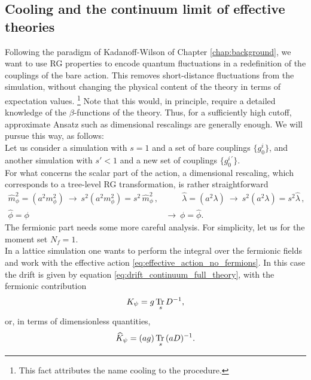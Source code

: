 \subsection{Cooling and the continuum limit of effective theories}
Following the paradigm of Kadanoff-Wilson of Chapter \ref{chap:background}, we want to use RG properties to encode quantum fluctuations in a redefinition of the couplings of the bare action. This removes short-distance fluctuations from the simulation, without changing the physical content of the theory in terms of expectation values. \footnote{This fact attributes the name cooling to the procedure.}
Note that this would, in principle, require a detailed knowledge of the $\beta$-functions of the theory. Thus, for a sufficiently high cutoff, approximate Ansatz such as dimensional rescalings are generally enough. We will pursue this way, as follows: \\
Let us consider a simulation with $s=1$ and a set of bare couplings $\{g^i_0\}$, and another simulation with $s'<1$ and a new set of couplings $\{g^{i \, \prime}_0\}$. \\
For what concerns the scalar part of the action, a dimensional rescaling, which corresponds to a tree-level RG transformation, is rather straightforward
\begin{equation*}
    \begin{aligned}
    \hat{m}_\phi^2 = (a^2m_\phi^2) \ \to \ s^2(a^2m_\phi^2) = s^2 \, \hat{m}_\phi^2 \, , &\qquad \hat{\lambda} = (a^2\lambda) \ \to  \ s^2 (a^2\lambda) = s^2\hat{\lambda} \, , \\
    \hat\phi = \phi \ &\to \ \phi = \hat\phi.
    \end{aligned}
\end{equation*}
The fermionic part needs some more careful analysis. For simplicity, let us for the moment set $N_f = 1$. \\
In a lattice simulation one wants to perform the integral over the fermionic fields and work with the effective action \eqref{eq:effective_action_no_fermions}. In this case the drift is given by equation \eqref{eq:drift_continuum_full_theory}, with the fermionic contribution
\begin{equation}
    	K_{\psi} = g \, \underset{s}{\operatorname{\text{Tr} \,}}{D^{-1}},
	\label{eq:fermionic_drift_contribution}
\end{equation}
or, in terms of dimensionless quantities,
\begin{equation*}
    \widehat{K}_{\psi} = (ag) \, \underset{s}{\operatorname{\text{Tr} \,}}{(aD)^{-1}}.
\end{equation*}
